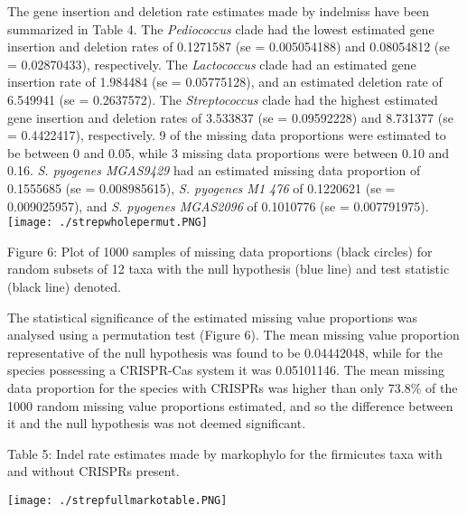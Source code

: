 \documentclass[english]{article}
\begin{document}
The gene insertion and deletion rate estimates made by indelmiss have
been summarized in Table 4. 
The \textit{Pediococcus}  clade had the lowest estimated  
gene insertion   and
deletion rates  of 0.1271587 (se = 0.005054188) and 0.08054812 (se =
0.02870433), respectively. The \textit{Lactococcus} clade had an 
estimated gene
insertion rate of 1.984484 (se = 0.05775128), and an estimated
deletion rate of 6.549941 (se = 0.2637572). The \textit{Streptococcus} 
clade
had  the  highest  estimated  gene insertion and deletion rates  of
3.533837 (se = 0.09592228) and 8.731377 (se = 0.4422417),
respectively. 9 of the missing data  proportions  were estimated  to
be between 0 and 0.05, while 3 missing data proportions were between
0.10 and 0.16.  \textit{S. pyogenes MGAS9429} had an estimated  missing data
proportion  of 0.1555685 (se = 0.008985615), \textit{S. pyogenes M1
476} of
0.1220621 (se = 0.009025957), and \textit{S. pyogenes MGAS2096} of 0.1010776
(se = 0.007791975). 
\singlespacing
\texttt{[image: ./strepwholepermut.PNG]}
\caption{Figure 6: Plot of 1000 samples of missing data proportions
(black circles) for random subsets of 12 taxa with the null hypothesis
(blue line) and test statistic (black line) denoted.}
\singlespacing
The statistical significance of the estimated missing value
proportions was analysed using a permutation test (Figure 6). The mean missing
value proportion representative of the null hypothesis was found to be
0.04442048, while for the species possessing a CRISPR-Cas system it
was 0.05101146. The mean missing data proportion for the species with
CRISPRs was higher than only 73.8\% of the 1000 random missing value
proportions estimated, and so the difference between it and the null
hypothesis was not deemed significant.

\singlespacing
\caption{Table 5: Indel rate estimates made by markophylo for the
firmicutes taxa with and without CRISPRs present.}
\newline
\texttt{[image: ./strepfullmarkotable.PNG]}
\singlespacing
 
\end{document}
